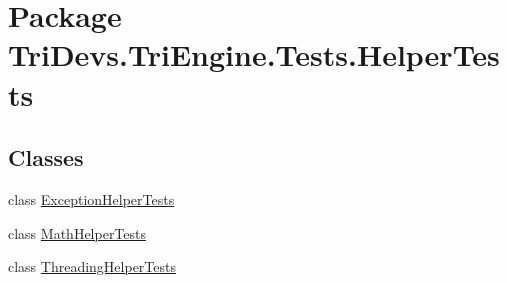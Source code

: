 \hypertarget{namespace_tri_devs_1_1_tri_engine_1_1_tests_1_1_helper_tests}{\section{Package Tri\-Devs.\-Tri\-Engine.\-Tests.\-Helper\-Tests}
\label{namespace_tri_devs_1_1_tri_engine_1_1_tests_1_1_helper_tests}
}
\subsection*{Classes}
\begin{DoxyCompactItemize}
\item 
class \hyperlink{class_tri_devs_1_1_tri_engine_1_1_tests_1_1_helper_tests_1_1_exception_helper_tests}{Exception\-Helper\-Tests}
\item 
class \hyperlink{class_tri_devs_1_1_tri_engine_1_1_tests_1_1_helper_tests_1_1_math_helper_tests}{Math\-Helper\-Tests}
\item 
class \hyperlink{class_tri_devs_1_1_tri_engine_1_1_tests_1_1_helper_tests_1_1_threading_helper_tests}{Threading\-Helper\-Tests}
\end{DoxyCompactItemize}
